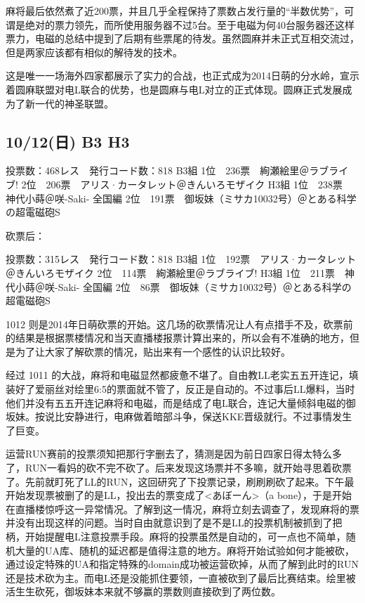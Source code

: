 麻将最后依然煮了近200票，并且几乎全程保持了票数占发行量的“半数优势”，可谓是绝对的票力领先，而所使用服务器不过5台。至于电磁为何40台服务器还这样票力，电磁的总结中提到了后期有些票尾的待发。虽然圆麻并未正式互相交流过，但是两家应该都有相似的解待发的技术。

这是唯一一场海外四家都展示了实力的合战，也正式成为2014日萌的分水岭，宣示着圆麻联盟对电L联合的优势，也是圆麻与电L对立的正式体现。圆麻正式发展成为了新一代的神圣联盟。

\subsection{10/12(日) B3 H3}

    投票数：468レス　発行コード数：818
    B3組
    1位　236票　絢瀬絵里＠ラブライブ!
    2位　206票　アリス·カータレット＠きんいろモザイク
    H3組
    1位　238票　神代小蒔＠咲-Saki- 全国編
    2位　191票　御坂妹（ミサカ10032号）＠とある科学の超電磁砲S

砍票后：

    投票数：315レス　発行コード数：818
    B3組
    1位　192票　アリス·カータレット＠きんいろモザイク
    2位　114票　絢瀬絵里＠ラブライブ!
    H3組
    1位　211票　神代小蒔＠咲-Saki- 全国編
    2位　86票　御坂妹（ミサカ10032号）＠とある科学の超電磁砲S

1012 则是2014年日萌砍票的开始。这几场的砍票情况让人有点措手不及，砍票前的结果是根据票楼情况和当天直播楼报票计算出来的，所以会有不准确的地方，但是为了让大家了解砍票的情况，贴出来有一个感性的认识比较好。

经过 1011 的大战，麻将和电磁显然都疲惫不堪了。自由教LL老实五五开连记，填装好了爱丽丝对绘里6:5的票面就不管了，反正是自动的。不过事后LL爆料，当时他们并没有五五开连记麻将和电磁，而是结成了电L联合，连记大量倾斜电磁的御坂妹。按说比安静进行，电麻做着暗部斗争，保送KKE晋级就行。不过事情发生了巨变。

运营RUN赛前的投票须知把那行字删去了，猜测是因为前日四家日得太特么多了，RUN一看妈的砍不完不砍了。后来发现这场票并不多嘛，就开始寻思着砍票了。先前就盯死了LL的RUN，这回研究了下投票记录，刷刷刷砍了起来。下午最开始发现票被删了的是LL，投出去的票变成了<あぼーん>（a bone），于是开始在直播楼惊呼这一异常情况。了解到这一情况，麻将立刻去调查了，发现麻将的票并没有出现这样的问题。当时自由就意识到了是不是LL的投票机制被抓到了把柄，开始提醒电L注意投票手段。麻将的投票虽然是自动的，可一点也不简单，随机大量的UA库、随机的延迟都是值得注意的地方。麻将开始试验如何才能被砍，通过设定特殊的UA和指定特殊的domain成功被运营砍掉，从而了解到此时的RUN还是技术砍为主。而电L还是没能抓住要领，一直被砍到了最后比赛结束。绘里被活生生砍死，御坂妹本来就不够赢的票数则直接砍到了两位数。

